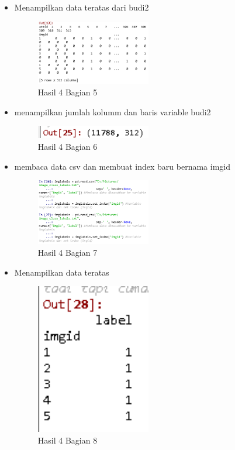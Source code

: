 \begin{itemize}
\item Menampilkan data teratas dari budi2

\begin{figure}[H]
\centerline{\includegraphics[width=5cm]{figures/1174089/3/praktek7.PNG}}
\caption{Hasil 4 Bagian 5}
\label{labelgambar}
\end{figure}

\item menampilkan jumlah kolumm dan baris variable budi2

\begin{figure}[H]
\centerline{\includegraphics[width=5cm]{figures/1174089/3/praktek8.PNG}}
\caption{Hasil 4 Bagian 6}
\label{labelgambar}
\end{figure}

\item membaca data csv dan membuat index baru bernama imgid

\begin{figure}[H]
\centerline{\includegraphics[width=5cm]{figures/1174089/3/praktek9.PNG}}
\caption{Hasil 4 Bagian 7}
\label{labelgambar}
\end{figure}

\item Menampilkan data teratas

\begin{figure}[H]
\centerline{\includegraphics[width=5cm]{figures/1174089/3/praktek10.PNG}}
\caption{Hasil 4 Bagian 8}
\label{labelgambar}
\end{figure}


\end{itemize}

